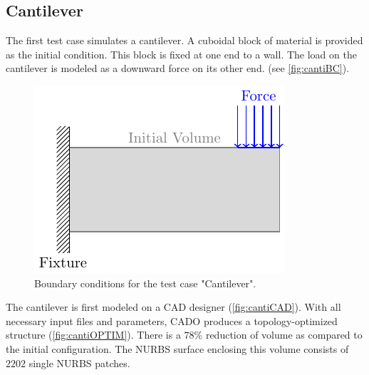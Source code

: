 \subsection{Cantilever}
\label{ssec:canti}
The first test case simulates a cantilever. A cuboidal block of material is provided as the initial condition. This block is fixed at one end to a wall. The load on the cantilever is modeled as a downward force on its other end. (see \autoref{fig:cantiBC}).
\begin{figure}[H]
\begin{center}
\includegraphics[scale=0.8]{Pictures/tikzCantilever/canti.pdf}
\end{center}
\caption{Boundary conditions for the test case "Cantilever".}
\label{fig:cantiBC}
\end{figure}

The cantilever is first modeled on a CAD designer (\autoref{fig:cantiCAD}). With all necessary input files and parameters, CADO produces a topology-optimized structure (\autoref{fig:cantiOPTIM}). There is a $78\%$ reduction of volume as compared to the initial configuration. The NURBS surface enclosing this volume consists of $2202$ single NURBS patches.

